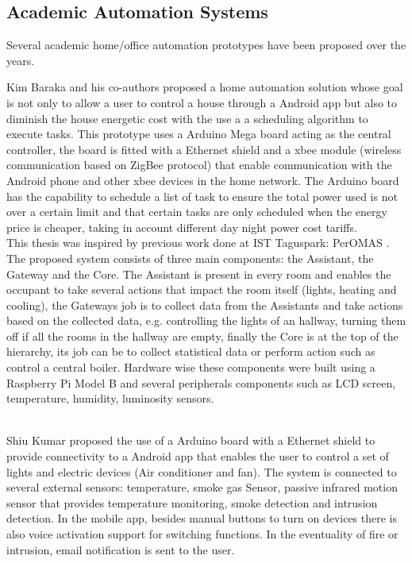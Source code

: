 \subsection{Academic Automation Systems}

Several academic home/office automation prototypes have been proposed over the years.

Kim Baraka and his co-authors proposed a home automation solution whose goal is not only to allow a user to control a house through a Android app but also to diminish the house energetic cost with the use a a scheduling algorithm \cite{academic:arduino1} to execute tasks. This prototype uses a Arduino Mega board acting as the central controller, the board is fitted with a Ethernet shield and a xbee module (wireless communication based on ZigBee protocol) that enable communication with the Android phone and other xbee devices in the home network. The Arduino board has the capability to schedule a list of task to ensure the total power used is not over a certain limit and that certain tasks are only scheduled when the energy price is cheaper, taking in account different day night power cost tariffs.
\mbox{}\\

This thesis was inspired by previous work done at IST Taguspark: \ac{PerOMAS} \cite{peromas}. The proposed system consists of three main components: the Assistant, the Gateway and the Core.  The Assistant is present in every room and enables the occupant to take several actions that impact the room itself (lights, heating and cooling), the Gateways job is to collect data from the Assistants and take actions based on the collected data, e.g. controlling the lights of an hallway, turning them off if all the rooms in the hallway are empty, finally the Core is at the top of the hierarchy, its job can be to collect statistical data or perform action such as control a central boiler. 
Hardware wise these components were built using a Raspberry Pi Model B and several peripherals components such as LCD screen, temperature, humidity, luminosity sensors.

\mbox{}\\
Shiu Kumar proposed the use of a Arduino board with a Ethernet shield to provide connectivity to a Android app that enables the user to control a set of lights and electric devices (Air conditioner and fan)\cite{academic3}. The system is connected to several external sensors: temperature, smoke gas Sensor, passive infrared motion sensor that provides temperature monitoring, smoke detection and intrusion detection.
In the mobile app, besides manual buttons to turn on devices there is also voice activation support for switching functions. In the eventuality of fire or intrusion, email notification is sent to the user.


